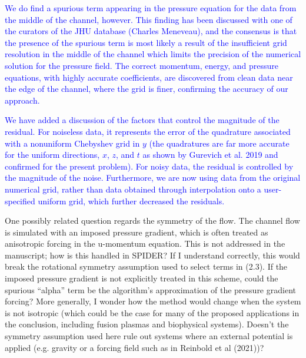 \documentclass{article}
\newcommand{\response}{\textcolor{blue}}
\begin{document}
\response{
We do find a spurious term appearing in the pressure equation for the data from the middle of the channel, however. This finding has been discussed with one of the curators of the JHU database (Charles Meneveau), and the consensus is that the presence of the spurious term is most likely a result of the insufficient grid resolution in the middle of the channel which limits the precision of the numerical solution for the pressure field. The correct momentum, energy, and pressure equations, with highly accurate coefficients, are discovered from clean data near the edge of the channel, where the grid is finer, confirming the accuracy of our approach.}

\response{
We have added a discussion of the factors that control the magnitude of the residual. For noiseless data, it represents the error of the quadrature associated with a nonuniform Chebyshev grid in $y$ (the quadratures are far more accurate for the uniform directions, $x$, $z$, and $t$ as shown by Gurevich et al. 2019 and confirmed for the present problem). For noisy data, the residual is controlled by the magnitude of the noise. Furthermore, we are now using data from the original numerical grid, rather than data obtained through interpolation onto a user-specified uniform grid, which further decreased the residuals.
}

\medskip
One possibly related question regards the symmetry of the flow.  The
channel flow is simulated with an imposed pressure gradient, which is
often treated as anisotropic forcing in the u-momentum equation.  This
is not addressed in the manuscript; how is this handled in SPIDER?  If
I understand correctly, this would break the rotational symmetry
assumption used to select terms in (2.3).   If the imposed pressure
gradient is not explicitly treated in this scheme, could the spurious
“alpha” term be the algorithm’s approximation of the pressure gradient
forcing?  More generally, I wonder how the method would change when
the system is not isotropic (which could be the case for many of the
proposed applications in the conclusion, including fusion plasmas and
biophysical systems).  Doesn’t the symmetry assumption used here rule
out systems where an external potential is applied (e.g. gravity or a
forcing field such as in Reinbold et al (2021))?
\end{document}
